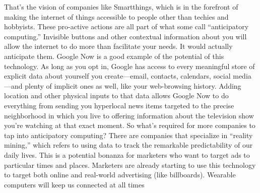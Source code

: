 That’s the vision of companies like Smartthings, which is in the forefront of making the internet of things accessible to people other than techies and hobbyists.
These pro-active actions are all part of what some call “anticipatory computing.” Invisible buttons and other contextual information about you will allow the internet to do more than facilitate your needs. It would actually anticipate them. Google Now is a good example of the potential of this technology. As long as you opt in, Google has access to every meaningful store of explicit data about yourself you create—email, contacts, calendars, social media—and plenty of implicit ones as well, like your web-browsing history. Adding location and other physical inputs to that data allows Google Now to do everything from sending you hyperlocal news items targeted to the precise neighborhood in which you live to offering information about the television show you’re watching at that exact moment.
So what’s required for more companies to tap into anticipatory computing? There are companies that specialize in “reality mining,” which refers to using data to track the remarkable predictability of our daily lives. This is a potential bonanza for marketers who want to target ads to particular times and places. Marketers are already starting to use this technology to target both online and real-world advertising (like billboards).
Wearable computers will keep us connected at all times

